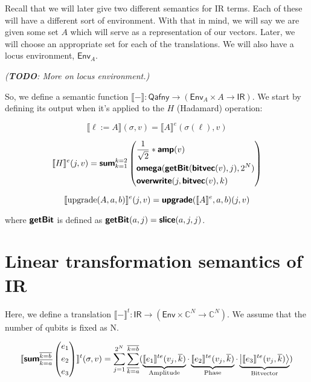 \documentclass[runningheads]{llncs}
\newcommand {\ra} {\rightarrow}
\newcommand {\Env} {\textsf{Env}}
\newcommand {\sem} [1] {\llbracket #1 \rrbracket}
\newcommand {\semE} [1] {\sem{#1}^e}
\newcommand {\Tsem} [1] {\sem{#1}^t}
\newcommand {\TsemE} [1] {\sem{#1}^{te}}
\newcommand {\ket}[1]{\ensuremath{\left|#1\right\rangle}}
\newcommand {\ir} [1] {\textsf{\textbf{#1}}}
\newcommand {\IRep} {\textsf{IR}}
\newcommand {\irUpgrade} {\ir{upgrade}}
\newcommand {\irSum} {\ir{sum}}
\newcommand {\irOverwrite} {\ir{overwrite}}
\newcommand {\irSlice} {\ir{slice}}
\newcommand {\irGetBit} {\ir{getBit}}
\newcommand {\irAmp} {\ir{amp}}
\newcommand {\irBV} {\ir{bitvec}}
\newcommand {\irOmega} {\ir{omega}}
\newcommand {\qafnyUpgrade} {\textnormal{upgrade}}
\newcommand {\Qafny} {\textsf{Qafny}}
\begin{document}
Recall that we will later give two different semantics for IR terms. Each of these will have a different sort of environment. With that in mind, we will say we are given some set $A$ which will serve as a representation of our vectors. Later, we will choose an appropriate set for each of the translations. We will also have a locus environment, $\Env_A$.

\textit{(\textbf{TODO}: More on locus environment.)}

So, we define a semantic function $\sem{-} : \Qafny \ra (\Env_A \times A \ra \IRep)$. We start by defining its output when it's applied to the $H$ (Hadamard) operation:

\[
  \sem{\ell := A}(\sigma, v) = \semE{A}(\sigma(\ell), v)
\]

\[
  \semE{H}(j, v) = 
  \irSum_{k=1}^{k=2}
    \left(\begin{aligned}
      &\frac{1}{\sqrt{2}} * \irAmp(v)\\
      &\irOmega(\irGetBit(\irBV(v), j), 2^N)\\
      &\irOverwrite(j, \irBV(v), k)
      \end{aligned}\right)
\]

\[
  \semE{\qafnyUpgrade(A, a, b)}(j, v) = \irUpgrade(\semE{A}, a, b)(j, v)
\]

where $\irGetBit$ is defined as $\irGetBit(a, j) = \irSlice(a, j, j)$.

\section{Linear transformation semantics of IR}

Here, we define a translation $\Tsem{-} : \IRep \ra (\Env \times \mathbb{C}^N \ra \mathbb{C}^N)$. We assume that the number of qubits is fixed as N.

\[
  \Tsem{\irSum_{\overline{k=a}}^{\overline{k=b}}
    \left(\begin{aligned}
      &e_1\\
      &e_2\\
      &e_3
    \end{aligned}\right)}(\sigma, v)
    =
    \sum_{j=1}^{2^N}\sum_{\overline{k=a}}^{\overline{k=b}}
      (\underbrace{\TsemE{e_1}(v_j, \overline{k})}_{\textnormal{Amplitude}} \cdot \underbrace{\TsemE{e_2}(v_j, \overline{k})}_{\textnormal{Phase}} \cdot \underbrace{\ket{\TsemE{e_3}(v_j, \overline{k})}}_{\textnormal{Bitvector}})
\]
\end{document}
